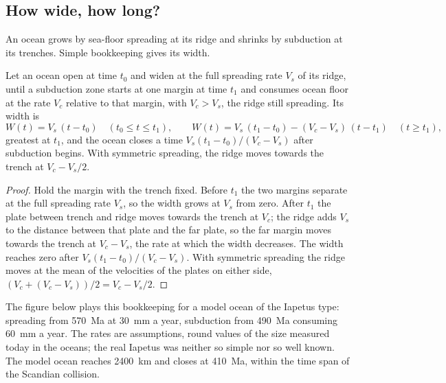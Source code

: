 \subsection{How wide, how long?}

An ocean grows by sea-floor spreading at its ridge and shrinks by subduction at its trenches.
Simple bookkeeping gives its width.

\begin{proposition}\label{prop:b2:wilson-cycle:width}
Let an ocean open at time $t_0$ and widen at the full spreading rate $V_s$ of its ridge, until a
subduction zone starts at one margin at time $t_1$ and consumes ocean floor at the rate $V_c$
relative to that margin, with $V_c > V_s$, the ridge still spreading. Its width is
\[
  W(t) = V_s\,(t - t_0) \quad (t_0 \le t \le t_1), \qquad
  W(t) = V_s\,(t_1 - t_0) - (V_c - V_s)\,(t - t_1) \quad (t \ge t_1),
\]
greatest at $t_1$, and the ocean closes a time $V_s(t_1 - t_0)/(V_c - V_s)$ after subduction
begins. With symmetric spreading, the ridge moves towards the trench at $V_c - V_s/2$.
\end{proposition}

\begin{proof}
Hold the margin with the trench fixed. Before $t_1$ the two margins separate at the full
spreading rate $V_s$, so the width grows at $V_s$ from zero. After $t_1$ the plate between
trench and ridge moves towards the trench at $V_c$; the ridge adds $V_s$ to the distance
between that plate and the far plate, so the far margin moves towards the trench at $V_c - V_s$,
the rate at which the width decreases. The width reaches zero after $V_s(t_1 - t_0)/(V_c -
V_s)$. With symmetric spreading the ridge moves at the mean of the velocities of the plates on
either side, $(V_c + (V_c - V_s))/2 = V_c - V_s/2$.
\end{proof}

The figure below plays this bookkeeping for a model ocean of the Iapetus type: spreading from
\qty{570}{Ma} at \qty{30}{mm} a year, subduction from \qty{490}{Ma} consuming \qty{60}{mm} a
year. The rates are assumptions, round values of the size measured today in the oceans; the
real Iapetus was neither so simple nor so well known. The model ocean reaches \qty{2400}{km}
and closes at \qty{410}{Ma}, within the time span of the Scandian collision.

